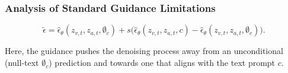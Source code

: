 

\subsubsection{Analysis of Standard Guidance Limitations}
\begin{small}
\begin{equation}
    \tilde{\epsilon} = \hat{\epsilon}_{\theta}(z_{v,t}, z_{a,t}, \emptyset_c) + s \Big( \hat{\epsilon}_{\theta}(z_{v,t}, z_{a,t}, c) - \hat{\epsilon}_{\theta}(z_{v,t}, z_{a,t}, \emptyset_c) \Big).
    \label{eq:standard_cfg}
\end{equation}
\end{small}
Here, the guidance pushes the denoising process away from an unconditional (null-text $\emptyset_c$) prediction and towards one that aligns with the text prompt $c$.

